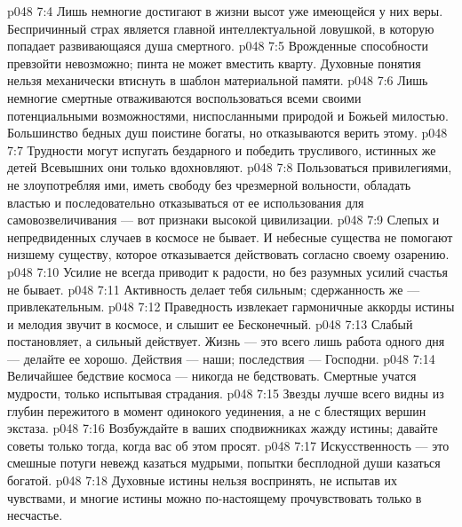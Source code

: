 \vs p048 7:4 \bibnobreakspace Лишь немногие достигают в жизни высот уже имеющейся у них веры. Беспричинный страх является главной интеллектуальной ловушкой, в которую попадает развивающаяся душа смертного.
\vs p048 7:5 \bibnobreakspace Врожденные способности превзойти невозможно; пинта не может вместить кварту. Духовные понятия нельзя механически втиснуть в шаблон материальной памяти.
\vs p048 7:6 \bibnobreakspace Лишь немногие смертные отваживаются воспользоваться всеми своими потенциальными возможностями, ниспосланными природой и Божьей милостью. Большинство бедных душ поистине богаты, но отказываются верить этому.
\vs p048 7:7 \bibnobreakspace Трудности могут испугать бездарного и победить трусливого, истинных же детей Всевышних они только вдохновляют.
\vs p048 7:8 \bibnobreakspace Пользоваться привилегиями, не злоупотребляя ими, иметь свободу без чрезмерной вольности, обладать властью и последовательно отказываться от ее использования для самовозвеличивания --- вот признаки высокой цивилизации.
\vs p048 7:9 \bibnobreakspace Слепых и непредвиденных случаев в космосе не бывает. И небесные существа не помогают низшему существу, которое отказывается действовать согласно своему озарению.
\vs p048 7:10 \bibnobreakspace Усилие не всегда приводит к радости, но без разумных усилий счастья не бывает.
\vs p048 7:11 \bibnobreakspace Активность делает тебя сильным; сдержанность же --- привлекательным.
\vs p048 7:12 \bibnobreakspace Праведность извлекает гармоничные аккорды истины и мелодия звучит в космосе, и слышит ее Бесконечный.
\vs p048 7:13 \bibnobreakspace Слабый постановляет, а сильный действует. Жизнь --- это всего лишь работа одного дня --- делайте ее хорошо. Действия --- наши; последствия --- Господни.
\vs p048 7:14 \bibnobreakspace Величайшее бедствие космоса --- никогда не бедствовать. Смертные учатся мудрости, только испытывая страдания.
\vs p048 7:15 \bibnobreakspace Звезды лучше всего видны из глубин пережитого в момент одинокого уединения, а не с блестящих вершин экстаза.
\vs p048 7:16 \bibnobreakspace Возбуждайте в ваших сподвижниках жажду истины; давайте советы только тогда, когда вас об этом просят.
\vs p048 7:17 \bibnobreakspace Искусственность --- это смешные потуги невежд казаться мудрыми, попытки бесплодной души казаться богатой.
\vs p048 7:18 \bibnobreakspace Духовные истины нельзя воспринять, не испытав их чувствами, и многие истины можно по\hyp{}настоящему прочувствовать только в несчастье.
